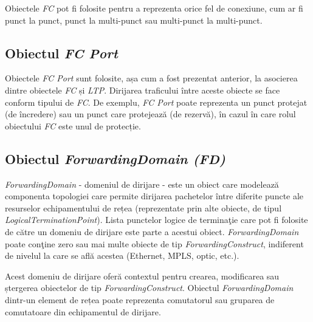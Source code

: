 Obiectele \textit{FC} pot fi folosite pentru a reprezenta orice fel de conexiune, cum ar fi punct la punct, punct la multi-punct sau multi-punct la multi-punct.

\subsection{Obiectul \textit{FC Port}}

Obiectele \textit{FC Port} sunt folosite, așa cum a fost prezentat anterior, la asocierea dintre obiectele \textit{FC} și \textit{LTP}. Dirijarea traficului între aceste obiecte se face conform tipului de \textit{FC}. De exemplu, \textit{FC Port} poate reprezenta un punct protejat (de încredere) sau un punct care protejează (de rezervă), în cazul în care rolul obiectului \textit{FC} este unul de protecție.

\subsection{Obiectul \textit{ForwardingDomain (FD)}}

\textit{ForwardingDomain} - domeniul de dirijare - este un obiect care modelează componenta topologiei care permite dirijarea pachetelor între diferite puncte ale resurselor echipamentului de rețea (reprezentate prin alte obiecte, de tipul \textit{LogicalTerminationPoint}). Lista punctelor logice de terminaţie care pot fi folosite de către un domeniu de dirijare este parte a acestui obiect. \textit{ForwardingDomain} poate conţine zero sau mai multe obiecte de tip \textit{ForwardingConstruct}, indiferent de nivelul la care se află acestea (Ethernet, MPLS, optic, etc.). 

Acest domeniu de dirijare oferă contextul pentru crearea, modificarea sau ștergerea obiectelor de tip \textit{ForwardingConstruct}. Obiectul \textit{ForwardingDomain} dintr-un element de rețea poate reprezenta comutatorul sau gruparea de comutatoare din echipamentul de dirijare.

